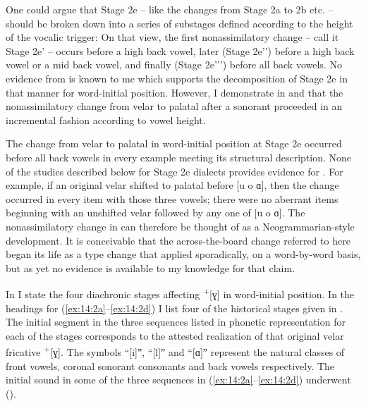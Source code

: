 One could argue that Stage 2e  {}-- like the changes from Stage 2a to 2b etc. -- should be broken down into a series of substages defined according to the height of the vocalic trigger: On that view, the first nonassimilatory change -- call it Stage 2e' -- occurs before a high back vowel, later (Stage 2e'{}') before a high back vowel or a mid back vowel, and finally (Stage 2e'{}'{}') before all back vowels. No evidence from is known to me which supports the decomposition of Stage 2e in that manner for word-initial position. However, I demonstrate in  and  that the nonassimilatory change from velar to palatal after a sonorant proceeded in an incremental fashion according to vowel height.

The change from velar to palatal in word-initial position at Stage 2e occurred before all back vowels in every example meeting its structural description. None of the studies described below for Stage 2e dialects provides evidence for . For example, if an original velar shifted to palatal before [u o ɑ], then the change occurred in every item with those three vowels; there were no aberrant items beginning with an unshifted velar followed by any one of [u o ɑ]. The nonassimilatory change in  can therefore be thought of as a Neogrammarian-style development. It is conceivable that the across-the-board change referred to here began its life as a  type change that applied sporadically, on a word-by-word basis, but as yet no evidence is available to my knowledge for that claim.

In  I state the four diachronic stages affecting  \textsuperscript{+}[ɣ] in word-initial position. In the headings for (\ref{ex:14:2a}--\ref{ex:14:2d}) I list four of the historical stages given in . The initial segment in the three sequences listed in phonetic representation for each of the stages corresponds to the attested realization of that original velar fricative \textsuperscript{+}[ɣ]. The symbols  “[i]ˮ, “[l]ˮ and  “[ɑ]ˮ represent the natural classes of front vowels, coronal sonorant consonants and back vowels respectively. The initial sound in some of the three sequences in (\ref{ex:14:2a}--\ref{ex:14:2d}) underwent  ().

